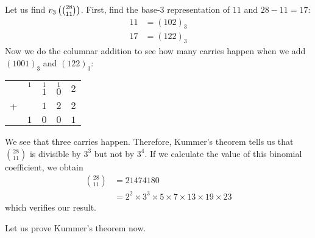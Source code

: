 \begin{example}
Let us find $v_{3}\left(\binom{28}{11}\right)$. First, find the base-$3$ representation of $11$ and $28-11=17$:
\begin{align*}
	11
	& = (102)_3\\
	17
	& = (122)_3
\end{align*}
Now we do the columnar addition to see how many carries happen when we add $(1001)_3$ and $(122)_3$:
\begin{center}
	\begin{tabular}{c*{4}{@{\,}c}}
		&  $\overset{1}{\phantom{1}}$   & $\overset{1}{1}$ & $\overset{1}{0}$ & $2$\\
		+& 		& $1$				   & $2$ 			  	  & $2$\\ \hline
		& $1$	& $0$				   & $0$ 			      & $1$\\
	\end{tabular}
\end{center}
We see that three carries happen. Therefore, Kummer's theorem tells us that $\binom{28}{11}$ is divisible by $3^3$ but not by $3^4$. If we calculate the value of this binomial coefficient, we obtain
\begin{align*}
	\binom{28}{11} &= 21474180\\
	&= 2^2 \times 3^3 \times 5 \times 7 \times 13 \times 19 \times 23
\end{align*}
which verifies our result.

Let us prove Kummer's theorem now.

\end{example}
